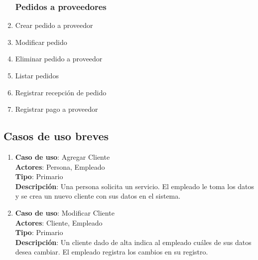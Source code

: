 \documentclass[12pt]{extarticle}
\begin{document}
\begin{spacing}{1.2}
\begin{multicols}{2}
\begin{enumerate}
        \subsubsection*{Pedidos a proveedores}
            \item Crear pedido a proveedor
            \item Modificar pedido %
            \item Eliminar pedido a proveedor
            \item Listar pedidos
            \item Registrar recepción de pedido
            \item Registrar pago a proveedor
    \end{enumerate}
    \end{multicols}

    \clearpage

    \subsection{Casos de uso breves}


    \begin{enumerate}



        \subsubsection{Clientes}



        \item 	\textbf{Caso de uso}: Agregar Cliente\\
                \textbf{Actores}: Persona, Empleado\\
                \textbf{Tipo}: Primario\\
                \textbf{Descripción}: Una persona solicita un servicio. El empleado le toma los datos y se crea un nuevo cliente con sus datos en el sistema.

        \item 	\textbf{Caso de uso}: Modificar Cliente\\
                \textbf{Actores}: Cliente, Empleado\\
                \textbf{Tipo}: Primario\\
                \textbf{Descripción}: Un cliente dado de alta indica al empleado cuáles de sus datos desea cambiar. El empleado registra los cambios en su registro.


\end{enumerate}
\end{spacing}
\end{document}
